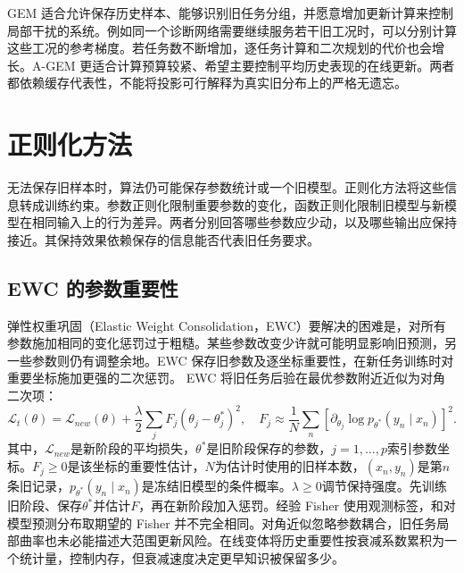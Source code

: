 GEM 适合允许保存历史样本、能够识别旧任务分组，并愿意增加更新计算来控制局部干扰的系统。例如同一个诊断网络需要继续服务若干旧工况时，可以分别计算这些工况的参考梯度。若任务数不断增加，逐任务计算和二次规划的代价也会增长。A-GEM 更适合计算预算较紧、希望主要控制平均历史表现的在线更新。两者都依赖缓存代表性，不能将投影可行解释为真实旧分布上的严格无遗忘。

\section{正则化方法}
无法保存旧样本时，算法仍可能保存参数统计或一个旧模型。正则化方法将这些信息转成训练约束。参数正则化限制重要参数的变化，函数正则化限制旧模型与新模型在相同输入上的行为差异。两者分别回答哪些参数应少动，以及哪些输出应保持接近。其保持效果依赖保存的信息能否代表旧任务要求。

\subsection{EWC 的参数重要性}
弹性权重巩固（Elastic Weight Consolidation，EWC）要解决的困难是，对所有参数施加相同的变化惩罚过于粗糙。某些参数改变少许就可能明显影响旧预测，另一些参数则仍有调整余地。EWC 保存旧参数及逐坐标重要性，在新任务训练时对重要坐标施加更强的二次惩罚。
EWC 将旧任务后验在最优参数附近近似为对角二次项\cite{kirkpatrick2017ewc}：
\begin{equation}
 \mathcal L_t(\theta)=\mathcal L_{new}(\theta)
 +\frac\lambda2\sum_jF_j(\theta_j-\theta_j^*)^2,
 \quad
 F_j\approx\frac1N\sum_n[\partial_{\theta_j}\log p_{\theta^*}(y_n\mid x_n)]^2.
\end{equation}
其中，$\mathcal L_{new}$是新阶段的平均损失，$\theta^*$是旧阶段保存的参数，$j=1,\ldots,p$索引参数坐标。$F_j\geq0$是该坐标的重要性估计，$N$为估计时使用的旧样本数，$(x_n,y_n)$是第$n$条旧记录，$p_{\theta^*}(y_n\mid x_n)$是冻结旧模型的条件概率。$\lambda\geq0$调节保持强度。先训练旧阶段、保存$\theta^*$并估计$F$，再在新阶段加入惩罚。经验 Fisher 使用观测标签，和对模型预测分布取期望的 Fisher 并不完全相同。对角近似忽略参数耦合，旧任务局部曲率也未必能描述大范围更新风险。在线变体将历史重要性按衰减系数累积为一个统计量，控制内存，但衰减速度决定更早知识被保留多少。


